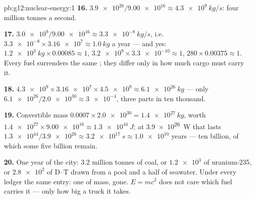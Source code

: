 \begin{solution}{pb:g12:nuclear-energy:1}
\textbf{16.} $\num{3.9e26}/\num{9.00e16} \approx \qty{4.3e9}{kg/s}$:
four million tonnes a second.

\textbf{17.} $\num{3.0e9}/\num{9.00e16} \approx \qty{3.3e-8}{kg/s}$,
i.e.\ $\num{3.3e-8} \times \num{3.16e7} \approx \qty{1.0}{kg}$ a year
--- and yes: $\qty{1.2e3}{kg} \times 0.00085 \approx 1$, $\num{3.2e9}
\times \num{3.3e-10} \approx 1$, $280 \times 0.00375 \approx 1$. Every
fuel surrenders the same ; they differ only in how much cargo
must carry it.

\textbf{18.} $\num{4.3e9} \times \num{3.16e7} \times \num{4.5e9}
\approx \qty{6.1e26}{kg}$ --- only $\num{6.1e26}/\num{2.0e30} \approx
\num{3e-4}$, three parts in ten thousand.

\textbf{19.} Convertible mass $0.0007 \times \num{2.0e30} =
\qty{1.4e27}{kg}$, worth $\num{1.4e27} \times \num{9.00e16} \approx
\qty{1.3e44}{J}$; at \qty{3.9e26}{W} that lasts $\num{1.3e44}/
\num{3.9e26} \approx \qty{3.2e17}{s} \approx \num{1.0e10}$ years ---
ten billion, of which some five billion remain.

\textbf{20.} One year of the city: $3.2$ million tonnes of coal, or
$\num{1.2e3}$  of uranium-235, or $\num{2.8e2}$  of
D--T drawn from a pool and a half of seawater. Under every ledger the
same entry: one  of mass, gone. $E = mc^2$ does not care which
fuel carries it --- only how big a truck it takes.
\end{solution}
